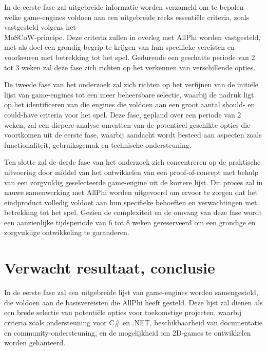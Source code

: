 In de eerste fase zal uitgebreide informatie worden verzameld om te bepalen welke game-engines voldoen aan een uitgebreide reeks essentiële criteria, zoals vastgesteld volgens het \\MoSCoW-principe. Deze criteria zullen in overleg met AllPhi worden vastgesteld, met als doel een grondig begrip te krijgen van hun specifieke vereisten en voorkeuren met betrekking tot het spel. Gedurende een geschatte periode van 2 tot 3 weken zal deze fase zich richten op het verkennen van verschillende opties.

De tweede fase van het onderzoek zal zich richten op het verfijnen van de initiële lijst van game-engines tot een meer beheersbare selectie, waarbij de nadruk ligt op het identificeren van die engines die voldoen aan een groot aantal should- en could-have criteria voor het spel. Deze fase, gepland over een periode van 2 weken, zal een diepere analyse omvatten van de potentieel geschikte opties die voortkomen uit de eerste fase, waarbij aandacht wordt besteed aan aspecten zoals functionaliteit, gebruiksgemak en technische ondersteuning.

Ten slotte zal de derde fase van het onderzoek zich concentreren op de praktische uitvoering door middel van het ontwikkelen van een proof-of-concept met behulp van een zorgvuldig geselecteerde game-engine uit de kortere lijst. Dit proces zal in nauwe samenwerking met AllPhi worden uitgevoerd om ervoor te zorgen dat het eindproduct volledig voldoet aan hun specifieke behoeften en verwachtingen met betrekking tot het spel. Gezien de complexiteit en de omvang van deze fase wordt een aanzienlijke tijdsperiode van 6 tot 8 weken gereserveerd om een grondige en zorgvuldige ontwikkeling te garanderen.


\section{Verwacht resultaat, conclusie}%
\label{sec:verwachte_resultaten}

In de eerste fase zal een uitgebreide lijst van game-engines worden samengesteld, die voldoen aan de basisvereisten die AllPhi heeft gesteld. Deze lijst zal dienen als een brede selectie van potentiële opties voor toekomstige projecten, waarbij criteria zoals ondersteuning voor C\# en .NET, beschikbaarheid van documentatie en community-ondersteuning, en de mogelijkheid om 2D-games te ontwikkelen worden gehanteerd.


